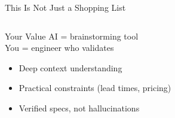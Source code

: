 \documentclass[aspectratio=169,11pt]{beamer}
\begin{document}
\begin{frame}[shrink=5]{This Is Not Just a Shopping List}
\begin{columns}
        \vspace{0.15cm}
        \begin{exampleblock}{Your Value}
            \small
            AI = brainstorming tool\\You = engineer who validates
            \begin{itemize}
                \item Deep context understanding
                \item Practical constraints (lead times, pricing)
                \item Verified specs, not hallucinations
            \end{itemize}
        \end{exampleblock}
    \end{columns}
\end{frame}
\end{document}
